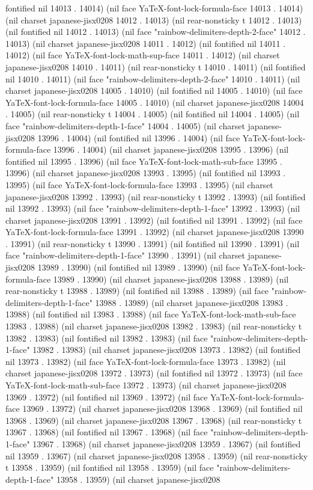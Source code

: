fontified nil 14013 . 14014) (nil face YaTeX-font-lock-formula-face 14013 . 14014) (nil charset japanese-jisx0208 14012 . 14013) (nil rear-nonsticky t 14012 . 14013) (nil fontified nil 14012 . 14013) (nil face "rainbow-delimiters-depth-2-face" 14012 . 14013) (nil charset japanese-jisx0208 14011 . 14012) (nil fontified nil 14011 . 14012) (nil face YaTeX-font-lock-math-sup-face 14011 . 14012) (nil charset japanese-jisx0208 14010 . 14011) (nil rear-nonsticky t 14010 . 14011) (nil fontified nil 14010 . 14011) (nil face "rainbow-delimiters-depth-2-face" 14010 . 14011) (nil charset japanese-jisx0208 14005 . 14010) (nil fontified nil 14005 . 14010) (nil face YaTeX-font-lock-formula-face 14005 . 14010) (nil charset japanese-jisx0208 14004 . 14005) (nil rear-nonsticky t 14004 . 14005) (nil fontified nil 14004 . 14005) (nil face "rainbow-delimiters-depth-1-face" 14004 . 14005) (nil charset japanese-jisx0208 13996 . 14004) (nil fontified nil 13996 . 14004) (nil face YaTeX-font-lock-formula-face 13996 . 14004) (nil charset japanese-jisx0208 13995 . 13996) (nil fontified nil 13995 . 13996) (nil face YaTeX-font-lock-math-sub-face 13995 . 13996) (nil charset japanese-jisx0208 13993 . 13995) (nil fontified nil 13993 . 13995) (nil face YaTeX-font-lock-formula-face 13993 . 13995) (nil charset japanese-jisx0208 13992 . 13993) (nil rear-nonsticky t 13992 . 13993) (nil fontified nil 13992 . 13993) (nil face "rainbow-delimiters-depth-1-face" 13992 . 13993) (nil charset japanese-jisx0208 13991 . 13992) (nil fontified nil 13991 . 13992) (nil face YaTeX-font-lock-formula-face 13991 . 13992) (nil charset japanese-jisx0208 13990 . 13991) (nil rear-nonsticky t 13990 . 13991) (nil fontified nil 13990 . 13991) (nil face "rainbow-delimiters-depth-1-face" 13990 . 13991) (nil charset japanese-jisx0208 13989 . 13990) (nil fontified nil 13989 . 13990) (nil face YaTeX-font-lock-formula-face 13989 . 13990) (nil charset japanese-jisx0208 13988 . 13989) (nil rear-nonsticky t 13988 . 13989) (nil fontified nil 13988 . 13989) (nil face "rainbow-delimiters-depth-1-face" 13988 . 13989) (nil charset japanese-jisx0208 13983 . 13988) (nil fontified nil 13983 . 13988) (nil face YaTeX-font-lock-math-sub-face 13983 . 13988) (nil charset japanese-jisx0208 13982 . 13983) (nil rear-nonsticky t 13982 . 13983) (nil fontified nil 13982 . 13983) (nil face "rainbow-delimiters-depth-1-face" 13982 . 13983) (nil charset japanese-jisx0208 13973 . 13982) (nil fontified nil 13973 . 13982) (nil face YaTeX-font-lock-formula-face 13973 . 13982) (nil charset japanese-jisx0208 13972 . 13973) (nil fontified nil 13972 . 13973) (nil face YaTeX-font-lock-math-sub-face 13972 . 13973) (nil charset japanese-jisx0208 13969 . 13972) (nil fontified nil 13969 . 13972) (nil face YaTeX-font-lock-formula-face 13969 . 13972) (nil charset japanese-jisx0208 13968 . 13969) (nil fontified nil 13968 . 13969) (nil charset japanese-jisx0208 13967 . 13968) (nil rear-nonsticky t 13967 . 13968) (nil fontified nil 13967 . 13968) (nil face "rainbow-delimiters-depth-1-face" 13967 . 13968) (nil charset japanese-jisx0208 13959 . 13967) (nil fontified nil 13959 . 13967) (nil charset japanese-jisx0208 13958 . 13959) (nil rear-nonsticky t 13958 . 13959) (nil fontified nil 13958 . 13959) (nil face "rainbow-delimiters-depth-1-face" 13958 . 13959) (nil charset japanese-jisx0208 